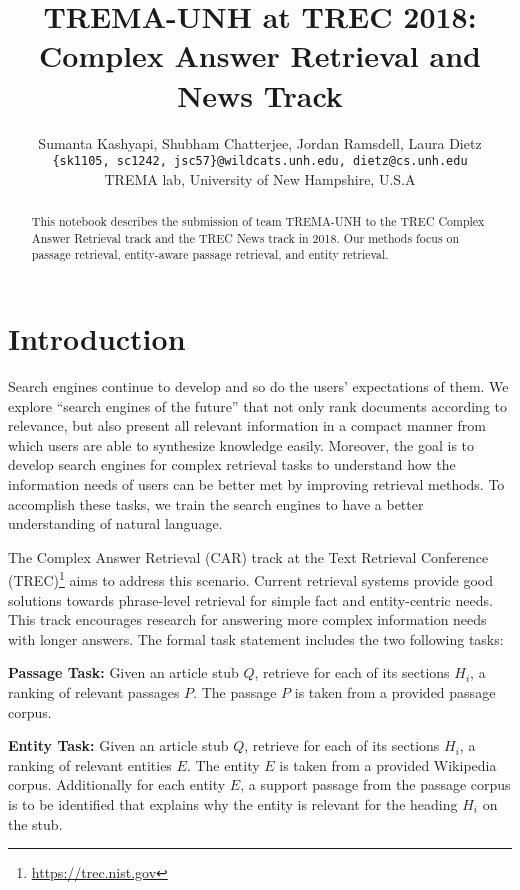 \documentclass{article}
\title{TREMA-UNH at TREC 2018: Complex Answer Retrieval and News Track}
\author{Sumanta Kashyapi, Shubham Chatterjee, Jordan Ramsdell, Laura Dietz \\
\texttt{\{sk1105, sc1242, jsc57\}@wildcats.unh.edu, dietz@cs.unh.edu}\\
TREMA lab, University of New Hampshire, U.S.A}
\date{}
\begin{document}
\maketitle 

\begin{abstract}
This notebook describes the submission of team TREMA-UNH to the TREC Complex Answer Retrieval track and the TREC News track in 2018. Our methods focus on passage retrieval, entity-aware passage retrieval, and entity retrieval.
\end{abstract}

\section{Introduction}
\label{S:1}

Search engines continue to develop and so do the users' expectations of them. We explore ``search engines of the future'' that not only rank documents according to relevance, but also present all relevant information in a compact manner from which users are able to synthesize knowledge easily. Moreover, the goal is to develop search engines for complex retrieval tasks to understand how the information needs of users can be better met by improving  retrieval methods. To accomplish these tasks, we train the search engines to have a better understanding of natural language. 

The Complex Answer Retrieval (CAR)\cite{trecdata21} track at the Text Retrieval Conference (TREC)\footnote{\url{https://trec.nist.gov}} aims to address this scenario. Current retrieval systems provide good solutions towards phrase-level retrieval for simple fact and entity-centric needs. This track encourages research for answering more complex information needs with longer answers.
The formal task statement includes the two following tasks:

\noindent \textbf{Passage Task:} Given an article stub $Q$, retrieve for each of its sections $H_i$, a ranking of relevant passages $P$. The passage $P$ is taken from a provided passage corpus.

\noindent \textbf{Entity Task:} Given an article stub $Q$, retrieve for each of its sections $H_i$, a ranking of relevant entities $E$. The entity $E$ is taken from a provided Wikipedia corpus. Additionally for each entity $E$, a support passage from the passage corpus is to be identified that explains why the entity is relevant for the heading $H_i$ on the stub.
\medskip
\end{document}

